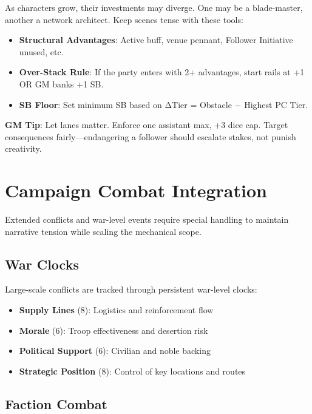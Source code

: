 As characters grow, their investments may diverge. One may be a blade-master, another a network architect. Keep scenes tense with these tools:

\begin{itemize}
    \item \textbf{Structural Advantages}: Active buff, venue pennant, Follower Initiative unused, etc.
    \item \textbf{Over-Stack Rule}: If the party enters with 2+ advantages, start rails at +1 OR GM banks +1 SB.
    \item \textbf{SB Floor}: Set minimum SB based on ΔTier = Obstacle − Highest PC Tier.
\end{itemize}

\textbf{GM Tip}: Let lanes matter. Enforce one assistant max, +3 dice cap. Target consequences fairly---endangering a follower should escalate stakes, not punish creativity.

\section*{Campaign Combat Integration}

Extended conflicts and war-level events require special handling to maintain narrative tension while scaling the mechanical scope.

\subsection*{War Clocks}

Large-scale conflicts are tracked through persistent war-level clocks:

\begin{itemize}
    \item \textbf{Supply Lines} (8): Logistics and reinforcement flow
    \item \textbf{Morale} (6): Troop effectiveness and desertion risk
    \item \textbf{Political Support} (6): Civilian and noble backing
    \item \textbf{Strategic Position} (8): Control of key locations and routes
\end{itemize}

\subsection*{Faction Combat}

